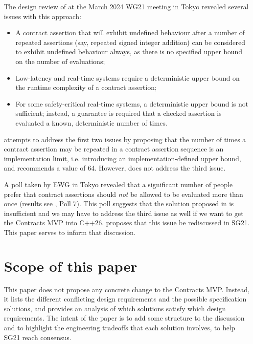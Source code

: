 The design review of \cite{P2900R6} at the March 2024 WG21 meeting in Tokyo revealed several issues with this approach:
\begin{itemize}
\item A contract assertion that will exhibit undefined behaviour after a number of repeated assertions (say, repeated signed integer addition) can be considered to exhibit undefined behaviour always, as there is no specified upper bound on the number of evaluations;
\item Low-latency and real-time systems require a deterministic upper bound on the runtime complexity of a contract assertion;
\item For some safety-critical real-time systems, a deterministic upper bound is not sufficient; instead, a guarantee is required that a checked assertion is evaluated a known, deterministic number of times.
\end{itemize} 

\cite{P3119R0} attempts to address the first two issues by proposing that the number of times a contract assertion may be repeated in a contract assertion sequence is an implementation limit, i.e. introducing an implementation-defined upper bound, and recommends a value of 64. However, \cite{P3119R0} does not address the third issue.

\pagebreak %

 A poll taken by EWG in Tokyo revealed that a significant number of people prefer that contract assertions should \emph{not} be allowed to be evaluated more than once (results see \cite{D3197R0}, Poll 7). This poll suggests that the solution proposed in \cite{P3119R0} is insufficient and we may have to address the third issue as well if we want to get the Contracts MVP into C++26. \cite{D3197R0} proposes that this issue be rediscussed in SG21. This paper serves to inform that discussion.


\section{Scope of this paper}

This paper does not propose any concrete change to the Contracts MVP. Instead, it lists the different conflicting design requirements and the possible specification solutions, and provides an analysis of which solutions satisfy which design requirements. The intent of the paper is to add some structure to the discussion and to highlight the engineering tradeoffs that each solution involves, to help SG21 reach consensus.

